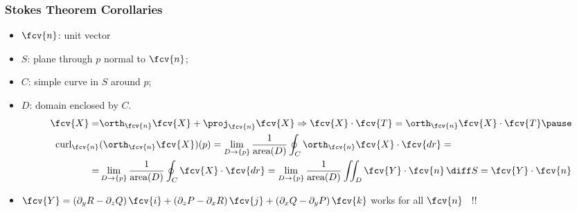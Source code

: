 \begin{frame}
  \frametitle{Stokes Theorem Corollaries}

  \begin{itemize}
    \item $\fcv{n}$: unit vector
    \item $S$: plane through $p$ normal to $\fcv{n}$;
    \item $C$: simple curve in $S$ around $p$;
    \item $D$: domain enclosed by $C$.\pause
    \begin{align*}
    \fcv{X} = & \orth_{\fcv{n}} \fcv{X} + \proj_{\fcv{n}} \fcv{X} \Rightarrow \fcv{X}\cdot \fcv{T} = \orth_{\fcv{n}} \fcv{X} \cdot \fcv{T} \pause \\
      \text{curl}_{\fcv{n}} &(\orth_{\fcv{n}} \fcv{X}) (p) = \lim_{D\to\{p\}} \frac{1}{\text{area}(D)} \oint_C \orth_{\fcv{n}} \fcv{X} \cdot \fcv{dr} = \\
      = & \lim_{D\to\{p\}} \frac{1}{\text{area}(D)} \oint_C
      \fcv{X}\cdot \fcv{dr} = \lim_{D\to\{p\}} \frac{1}{\text{area}(D)} \iint_D \fcv{Y}\cdot \fcv{n} \, \diff S = \fcv{Y}\cdot \fcv{n}
    \end{align*}
    \item \pause $\fcv{Y} = (\partial_y R - \partial_z Q) \, \fcv{i} +  (\partial_z P - \partial_x R) \, \fcv{j} + (\partial_x Q - \partial_y P) \, \fcv{k}$ works for all $\fcv{n}$ \, !!
  \end{itemize}
\end{frame}
